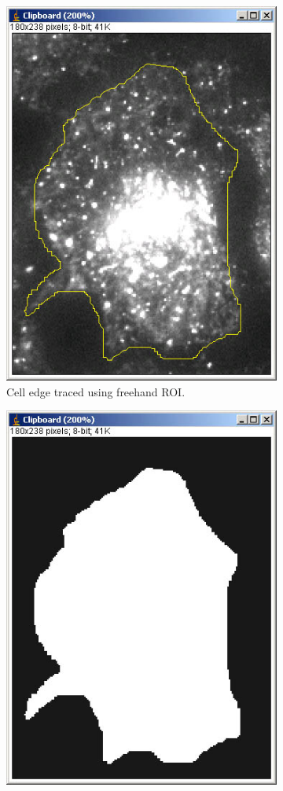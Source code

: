 \documentclass{article}
\begin{document}

\begin{figure}[!ht]
\begin{subfigure}{.5\textwidth}
  \centering
  \includegraphics[width=.8\linewidth]{img/celledgetrace.jpg}
  \caption{Cell edge traced using freehand ROI.}
  \label{fig:celledgeTraced}
\end{subfigure}%
\begin{subfigure}{.5\textwidth}
  \centering
  \includegraphics[width=.8\linewidth]{img/celledgetrace_bw.jpg}

\end{subfigure}
\end{figure}
\end{document}
